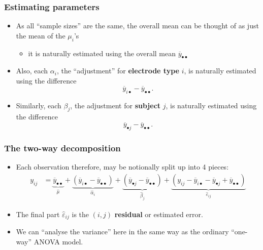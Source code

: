 \documentclass[a4paper]{article}\usepackage[]{graphicx}\usepackage[]{xcolor}
\begin{document}
\subsubsection{Estimating parameters}
\begin{itemize}
	\item As all ``sample sizes'' are the same, the overall mean can be thought of as just the mean of the \( \mu_i \)'s
	\begin{itemize}
		\item it is naturally estimated using the overall mean \( \overline{y}_{\bullet\bullet} \) 
	\end{itemize}
	\item Also, each \( \alpha_i \), the ``adjustment'' for \textcolor{mygreen}{\textbf{electrode type}} \( i \), is naturally estimated using the difference
	\[
		\overline{y}_{i\bullet} - \overline{y}_{\bullet\bullet}.
	\]
	\item Similarly, each \( \beta_j \), the adjustment for \textcolor{myred}{\textbf{subject}} \( j \), is naturally estimated using the difference
	\[
			\overline{y}_{\bullet j} - \overline{y}_{\bullet\bullet}.
	\]
\end{itemize}
\subsubsection{The two-way decomposition}
\begin{itemize}
	\item Each observation therefore, may be notionally split up into 4 pieces:
	\begin{align*}
		y_{ij}&= \underbrace{\overline y_{\bullet\bullet}}_{\hat\mu}+ \underbrace{(\overline y_{i\bullet}-\overline y_{\bullet\bullet})}_{\hat\alpha_i} + \underbrace{(\overline y_{\bullet j}-\overline y_{\bullet\bullet})}_{\hat\beta_j} + \underbrace{(y_{ij}-\overline y_{i\bullet}-\overline y_{\bullet j}+\overline y_{\bullet\bullet})}_{\hat\varepsilon_{ij}}
	\end{align*}
	\item The final part \( \hat{\varepsilon}_{ij} \) is the \( (i,j) \) \textbf{residual} or estimated error.
	\item We can ``analyse the variance'' here in the same way as the ordinary ``one-way'' ANOVA model.
\end{itemize}
\end{document}

